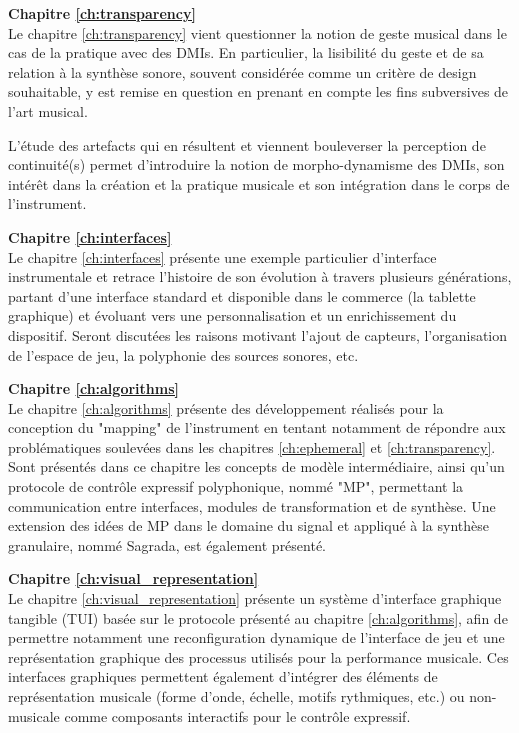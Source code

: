 \textbf{Chapitre \ref{ch:transparency}} \\[0.2em]
Le chapitre \ref{ch:transparency} vient questionner la notion de geste musical dans le cas de la pratique avec des DMIs. En particulier, la lisibilité du geste et de sa relation à la synthèse sonore, souvent considérée comme un critère de design souhaitable, y est remise en question en prenant en compte les fins subversives de l'art musical. 

L'étude des artefacts qui en résultent et viennent bouleverser la perception de continuité(s) permet d'introduire la notion de morpho-dynamisme des DMIs, son intérêt dans la création et la pratique musicale et son intégration dans le corps de l'instrument.

\textbf{Chapitre \ref{ch:interfaces}} \\[0.2em]
Le chapitre \ref{ch:interfaces} présente une exemple particulier d'interface instrumentale et retrace l'histoire de son évolution à travers plusieurs générations, partant d'une interface standard et disponible dans le commerce (la tablette graphique) et évoluant vers une personnalisation et un enrichissement du dispositif. 
Seront discutées les raisons motivant l'ajout de capteurs, l'organisation de l'espace de jeu, la polyphonie des sources sonores, etc.

\textbf{Chapitre \ref{ch:algorithms}} \\[0.2em]
Le chapitre \ref{ch:algorithms} présente des développement réalisés pour la conception du "mapping" de l'instrument en tentant notamment de répondre aux problématiques soulevées dans les chapitres \ref{ch:ephemeral} et \ref{ch:transparency}. Sont présentés dans ce chapitre les concepts de modèle intermédiaire, ainsi qu'un protocole de contrôle expressif polyphonique, nommé "MP", permettant la communication entre interfaces, modules de transformation et de synthèse. Une extension des idées de MP dans le domaine du signal et appliqué à la synthèse granulaire, nommé Sagrada, est également présenté.

\textbf{Chapitre \ref{ch:visual_representation}} \\[0.2em]
Le chapitre \ref{ch:visual_representation} présente un système d'interface graphique tangible (TUI) basée sur le protocole présenté au chapitre  \ref{ch:algorithms}, afin de permettre notamment une reconfiguration dynamique de l'interface de jeu et une représentation graphique des processus utilisés pour la performance musicale. Ces interfaces graphiques permettent également d'intégrer des éléments de représentation musicale (forme d'onde, échelle, motifs rythmiques, etc.) ou non-musicale comme composants interactifs pour le contrôle expressif.

